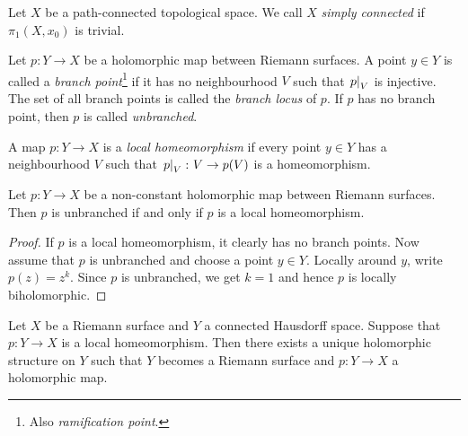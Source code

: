 \begin{definicija}
Let $X$ be a path-connected topological space. We call $X$
\emph{simply connected} if $\pi_1(X, x_0)$
is trivial.
\end{definicija}

\begin{definicija}
Let $p \colon Y \to X$ be a holomorphic map between Riemann
surfaces. A point $y \in Y$ is called a
\emph{branch point}\footnote{Also
\emph{ramification point}.} if it has no
neighbourhood $V$ such that $\left. p\right|_{V}^{}$ is injective. The set
of all branch points is called the
\emph{branch locus} of $p$. If $p$ has no branch point, then $p$ is
called \emph{unbranched}.
\end{definicija}

\begin{definicija}
A map $p \colon Y \to X$ is a
\emph{local homeomorphism} if every
point $y \in Y$ has a neighbourhood $V$ such that
$\left. p\right|_{V}^{} \colon V \to p(V)$ is a homeomorphism.
\end{definicija}

\begin{izrek}
Let $p \colon Y \to X$ be a non-constant holomorphic map between
Riemann surfaces. Then $p$ is unbranched if and only if $p$ is a
local homeomorphism.
\end{izrek}

\begin{proof}
If $p$ is a local homeomorphism, it clearly has no branch points.
Now assume that $p$ is unbranched and choose a point $y \in Y$.
Locally around $y$, write $p(z) = z^k$. Since $p$ is unbranched, we
get $k=1$ and hence $p$ is locally biholomorphic.
\end{proof}

\begin{izrek}
Let $X$ be a Riemann surface and $Y$ a connected Hausdorff space.
Suppose that $p \colon Y \to X$ is a local homeomorphism. Then
there exists a unique holomorphic structure on $Y$ such that $Y$
becomes a Riemann surface and $p \colon Y \to X$ a holomorphic map.
\end{izrek}

